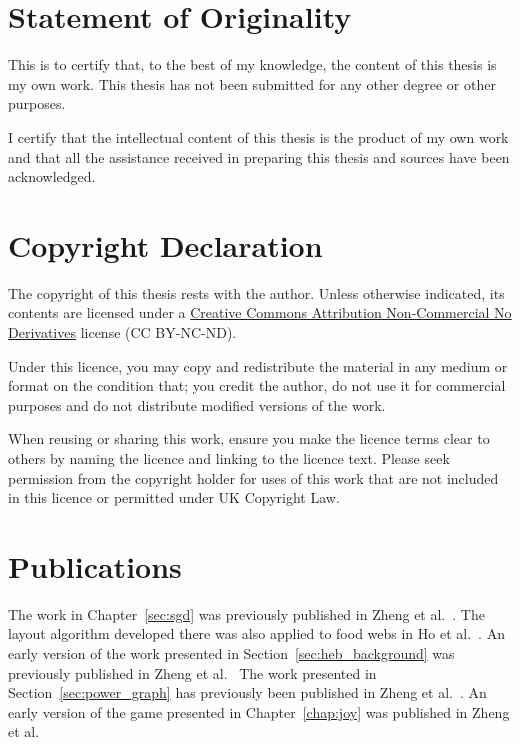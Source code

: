 \section{Statement of Originality}
This is to certify that, to the best of my knowledge, the content of this thesis is my own work. This thesis has not been submitted for any other degree or other purposes.

I certify that the intellectual content of this thesis is the product of my own work and that all the assistance received in preparing this thesis and sources have been acknowledged.

\section{Copyright Declaration}
The copyright of this thesis rests with the author. Unless otherwise indicated, its contents are licensed under a \href{http://creativecommons.org/licenses/by-nc-nd/4.0/}{Creative Commons Attribution Non-Commercial No Derivatives} license (CC BY-NC-ND).

Under this licence, you may copy and redistribute the material in any medium or format on the condition that; you credit the author, do not use it for commercial purposes and do not distribute modified versions of the work.

When reusing or sharing this work, ensure you make the licence terms clear to others by naming the licence and linking to the licence text. Please seek permission from the copyright holder for uses of this work that are not included in this licence or permitted under UK Copyright Law.

\section{Publications}

The work in Chapter~\ref{sec:sgd} was previously published in Zheng et al.\ \citep{Zheng2019Stochastic}. The layout algorithm developed there was also applied to food webs in Ho et al.\ \citep{Ho2019}.
An early version of the work presented in Section~\ref{sec:heb_background} was previously published in Zheng et al.\ \citep{Zheng2018}
The work presented in Section~\ref{sec:power_graph} has previously been published in Zheng et al.\ \citep{Zheng2019Power}.
An early version of the game presented in Chapter~\ref{chap:joy} was published in Zheng et al.\ \citep{Zheng2019Eco}